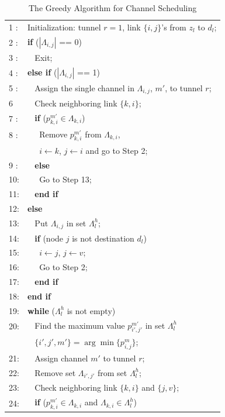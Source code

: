\documentclass[12pt,onecolumn,draftclsnofoot]{IEEEtran} %
\begin{document}
\begin{table}[!t]
\begin{center}
\caption{The Greedy Algorithm for Channel Scheduling}
\begin{tabular}{ll}
\hline
1 : & Initialization: tunnel $r=1$, link $\{i,j\}$'s from $z_l$ to $d_l$; \\ 
2 : & {\bf if} ($|\Lambda_{i,j}|$ == 0)  \\
3 : & $\;\;$ Exit; \\
4 : & {\bf else if} ($|\Lambda_{i,j}|$ == 1) \\
5 : & $\;\;$ Assign the single channel in $\Lambda_{i,j}$, $m'$, to tunnel $r$;  \\
6    & $\;\;$ Check neighboring link $\{k,i\}$; \\ 
7 : & $\;\;$ {\bf if} ($p_{k,i}^{m'} \in \Lambda_{k,i}$) \\
8 : & $\;\;\;\;$ Remove $p_{k,i}^{m'}$ from $\Lambda_{k,i}$,  \\
    & $\;\;\;\;$ $i \leftarrow k$, $j\leftarrow i$ and go to Step 2; \\
9 : & $\;\;$ {\bf else}  \\
10: & $\;\;\;\;$  Go to Step 13; \\
11: & $\;\;$ {\bf end if} \\
12: & {\bf else}  \\
13: & $\;\;$ Put $\Lambda_{i,j}$ in set $\Lambda_l^h$; \\
14: & $\;\;$ {\bf if} (node $j$ is not destination $d_l$) \\
15: & $\;\;\;\;$ $i \leftarrow j$, $j \leftarrow v$; \\
16: & $\;\;\;\;$ Go to Step 2; \\
17: & $\;\;$ {\bf end if} \\
18: & {\bf end if} \\
19: & {\bf while} ($\Lambda_l^h$ is not empty) \\
20: & $\;\;$ Find the maximum value $p_{i',j'}^{m'}$ in set $\Lambda_l^h$ \\
    & $\;\;$ $\{i',j',m'\}=\arg\min \{p_{i,j}^m\}$; \\
21: & $\;\;$ Assign channel $m'$ to tunnel $r$; \\
22: & $\;\;$ Remove set $\Lambda_{i',j'}$ from set $\Lambda_l^h$; \\
23: & $\;\;$ Check neighboring link $\{k,i\}$ and $\{j,v\}$; \\
24: & $\;\;$ {\bf if} ($p_{k,i}^{m'} \in \Lambda_{k,i}$ and $\Lambda_{k,i} \in \Lambda_l^h$) \\

\end{tabular}
\end{center}
\end{table}
\end{document}
